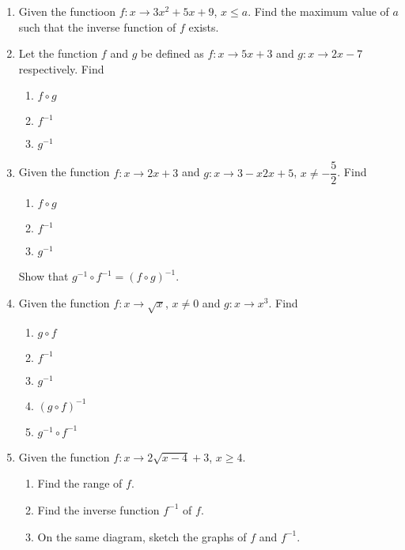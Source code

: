 \documentclass[12pt]{report}
\begin{document}
\begin{enumerate}
    \item Given the functioon $f:x \to 3x^2 + 5x + 9$, $x \leq a$. Find the maximum value
          of $a$ such that the inverse function of $f$ exists.

    \item Let the function $f$ and $g$ be defined as $f:x \to 5x + 3$ and $g:x \to 2x -
              7$ respectively. Find
          \begin{enumerate}
              \item $f \circ g$
              \item $f^{-1}$
              \item $g^{-1}$
          \end{enumerate}

    \item Given the function $f:x \to 2x + 3$ and $g:x \to {3-x}{2x + 5}$, $x \neq
              -\dfrac{5}{2}$. Find
          \begin{enumerate}
              \item $f \circ g$
              \item $f^{-1}$
              \item $g^{-1}$
          \end{enumerate}
          Show that $g^{-1} \circ f^{-1} = (f \circ g)^{-1}$.

    \item Given the function $f:x \to \sqrt{x}$, $x \neq 0$ and $g:x \to x^3$. Find
          \begin{enumerate}
              \item $g \circ f$
              \item $f^{-1}$
              \item $g^{-1}$
              \item $(g \circ f)^{-1}$
              \item $g^{-1} \circ f^{-1}$
          \end{enumerate}

    \item Given the function $f:x \to 2\sqrt{x-4} + 3$, $x \geq 4$.
          \begin{enumerate}
              \item Find the range of $f$.
              \item Find the inverse function $f^{-1}$ of $f$.
              \item On the same diagram, sketch the graphs of $f$ and $f^{-1}$.
          \end{enumerate}

\end{enumerate}
\end{document}
